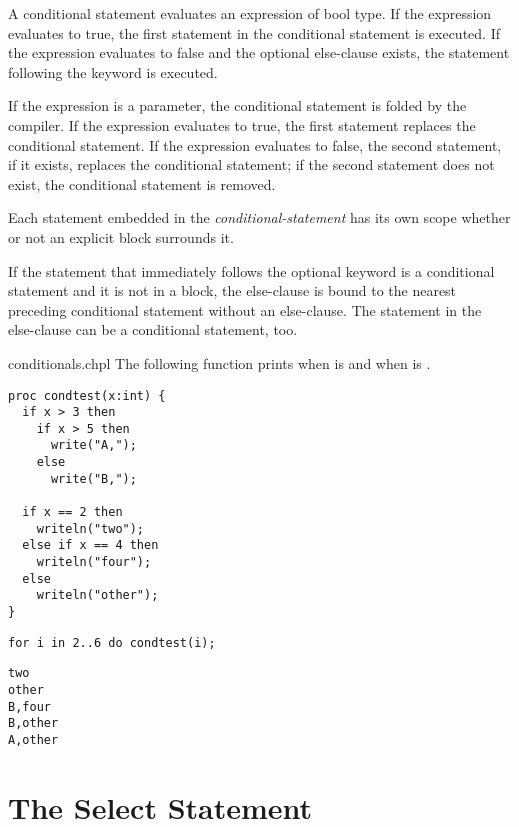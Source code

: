 A conditional statement evaluates an expression of bool type. If the
expression evaluates to true, the first statement in the conditional
statement is executed.  If the expression evaluates to false and the
optional else-clause exists, the statement following the
 keyword is executed.

If the expression is a parameter, the conditional statement is folded
by the compiler. If the expression evaluates to true, the first
statement replaces the conditional statement. If the expression
evaluates to false, the second statement, if it exists, replaces the
conditional statement; if the second statement does not exist, the
conditional statement is removed.

Each statement embedded in the {\em conditional-statement} has its own
scope whether or not an explicit block surrounds it.

If the statement that immediately follows the optional 
keyword is a conditional statement and it is not in a block, the
else-clause is bound to the nearest preceding conditional statement
without an else-clause.
The statement in the else-clause can be a conditional statement, too.

\begin{chapelexample}{conditionals.chpl}
The following function prints  when  is 
and  when  is .
\begin{chapel}
\begin{verbatim}
proc condtest(x:int) {
  if x > 3 then
    if x > 5 then
      write("A,");
    else
      write("B,");

  if x == 2 then
    writeln("two");
  else if x == 4 then
    writeln("four");
  else
    writeln("other");
}
\end{verbatim}
\end{chapel}
\begin{chapelpost}
\begin{verbatim}
for i in 2..6 do condtest(i);
\end{verbatim}
\end{chapelpost}
\begin{chapeloutput}
\begin{verbatim}
two
other
B,four
B,other
A,other
\end{verbatim}
\end{chapeloutput}
\end{chapelexample}

\pagebreak
\section{The Select Statement}
\label{The_Select_Statement}

